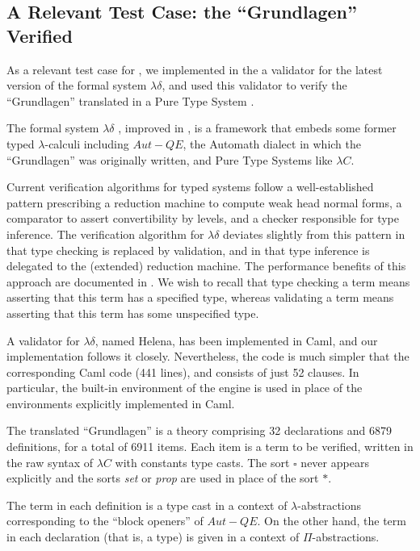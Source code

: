 \subsection{A Relevant Test Case: the ``Grundlagen'' Verified}
\label{grundlagen}

As a relevant test case for \elpi,
we implemented in the \frag{}
a validator for the latest version of the formal system $\lambda\delta$,
and used this validator to verify the
``Grundlagen'' \cite{Jut79} translated in a Pure Type System
\cite{Brn92}.

The formal system $\lambda\delta$ \cite{lambdadeltaJ1},
improved in \cite{lambdadeltaJ2a,lambdadeltaJ3a},
is a framework that embeds
some former typed $\lambda$-calculi including 
$Aut-QE$, the Automath dialect in which the ``Grundlagen'' was
originally written, and Pure Type Systems like $\lambda C$.

Current verification algorithms for typed systems follow
a well-established pattern prescribing a reduction
machine to compute weak head normal forms, a comparator to assert
convertibility by levels, and a checker responsible for type inference.
The verification algorithm for $\lambda\delta$ 
deviates slightly from this pattern in that
type checking is replaced by validation, and in that
type inference is delegated to the (extended) reduction machine. 
The performance benefits of this approach are documented in
\cite{lambdadeltaJ3a}.
We wish to recall that type checking a term means
asserting that this term has a specified type, whereas
validating a term means asserting that this term has 
some unspecified type.

A validator for $\lambda\delta$, named Helena,
has been implemented in Caml,
and our \lp{} implementation follows it closely.
Nevertheless, the \lp{} code is much simpler that the
corresponding Caml code (441 lines), and consists of just 52 clauses.
In particular, the built-in environment of the \lp{} engine is used in place of
the environments explicitly implemented in Caml. 

The translated ``Grundlagen'' is a theory comprising 
32 declarations and 6879 definitions, for a total of 6911 items.
Each item is a term to be verified, written in the raw syntax of
$\lambda C$ with constants type casts. The sort $\square$ never
appears explicitly and the sorts \emph{set} or \emph{prop}
are used in place of the sort $\ast$.

The term in each definition is a type cast in a 
context of $\lambda$-abstractions corresponding to the ``block openers''
of $Aut-QE$.
On the other hand, the term in each declaration (that is, a type) is
given in a context of $\Pi$-abstractions.

